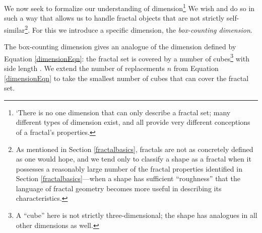 We now seek to formalize our understanding of dimension\footnote{`There is no one dimension that can only describe a fractal set; many different types of dimension exist, and all provide very different conceptions of a fractal's properties\citep{fractaltextbook}.} We wish  and do so in such a way that allows us to handle fractal objects that are not strictly self-similar\footnote{As mentioned in Section \ref{fractalbasics}, fractals are not as concretely defined as one would hope, and we tend only to classify a shape as a fractal when it possesses a reasonably large number of the fractal properties identified in Section \ref{fractalbasics}---when a shape has sufficient ``roughness'' that the language of fractal geometry becomes more useful in describing its characteristics.}. For this we introduce a specific dimension, the \textit{box-counting dimension}.

The box-counting dimension gives an analogue of the dimension defined by Equation \ref{dimensionEqn}: the fractal set is covered by a number of cubes\footnote{A ``cube'' here is not strictly three-dimensional; the shape has analogues in all other dimensions as well.} with side length \epsilon. We extend the number of replacements $n$ from Equation \ref{dimensionEqn} to take the smallest number of cubes that can cover the fractal set. 









